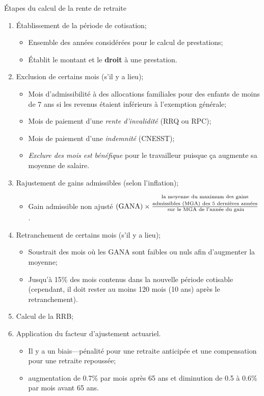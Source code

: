 \documentclass[10pt, french]{article}
\begin{document}
\begin{multicols*}{3}
\begin{algo}{Étapes du calcul de la rente de retraite}
\begin{enumerate}[leftmargin = *]
	\item	Établissement de la période de cotisation;
		\begin{itemize}[leftmargin = *]
		\item	Ensemble des années considérées pour le calcul de prestations;		
		\item	Établit le montant et le \textbf{droit} à une prestation.
		\end{itemize}
	\item	Exclusion de certains mois (s'il y a lieu);
		\begin{itemize}[leftmargin = *]
		\item	Mois d'admissibilité à des allocations familiales pour des enfants de moins de 7 ans si les revenus étaient inférieurs à l'exemption générale;
		\item	Mois de paiement d'une \textit{rente d'invalidité }(RRQ ou RPC);
		\item	Mois de paiement d'une \textit{indemnité} (CNESST);
		\item	\textit{Exclure des mois est bénéfique} pour le travailleur puisque ça augmente sa moyenne de salaire.
		\end{itemize}
	\item	Rajustement de gains admissibles (selon l'inflation);
		\begin{itemize}[leftmargin = *]
		\item	Gain admissible non ajusté 
		$\text{(GANA)} \times \frac{\text{\shortstack{la moyenne du maximum des gains\\ admissibles (MGA) des 5 dernières années}}}{\text{ sur le MGA de l'année du gain}}$.
		\end{itemize}
	\item	Retranchement de certains mois (s'il y a lieu);
		\begin{itemize}[leftmargin = *]
		\item	Soustrait des mois où les GANA sont faibles ou nuls afin d'augmenter la moyenne;
		\item	Jusqu'à 15\% des mois contenus dans la nouvelle période cotisable (cependant, il doit rester au moins 120 mois (10 ans) après le retranchement).
		\end{itemize}
	\item	Calcul de la RRB;
	\item	Application du facteur d'ajustement actuariel.
		\begin{itemize}[leftmargin = *]
		\item	Il y a un biais---pénalité pour une retraite anticipée et une compensation pour une retraite repoussée;
		\item	augmentation de 0.7\% par mois après 65 ans et diminution de 0.5 à 0.6\% par mois  avant 65 ans.
		\end{itemize}
\end{enumerate}
\end{algo}


\end{multicols*}
\end{document}
